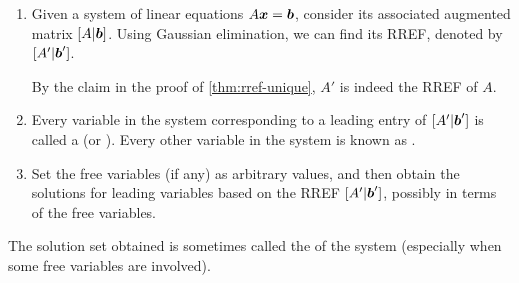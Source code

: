 \begin{enumerate}
\begin{enumerate}
\item Given a system of linear equations \(A\vb*{x}=\vb*{b}\), consider its
associated augmented matrix \([A|\vb*{b}]\). Using Gaussian elimination, we
can find its RREF, denoted by \([A'|\vb*{b}']\). \begin{note}
By the claim in the proof of \cref{thm:rref-unique}, \(A'\) is indeed the RREF
of \(A\).
\end{note}

\item Every variable in the system corresponding to a leading entry of
\([A'|\vb*{b}']\) is called a  (or ). Every other variable in the system is known as .
\item Set the free variables (if any) as arbitrary values, and then obtain the
solutions for leading variables based on the RREF \([A'|\vb*{b}']\), possibly
in terms of the free variables.
\end{enumerate}
\begin{note}
The solution set obtained is sometimes called the  of
the system (especially when some free variables are involved).
\end{note}
\end{enumerate}

